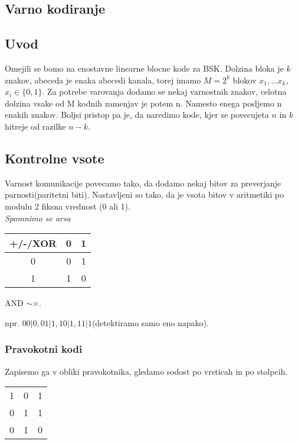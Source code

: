 \documentclass{article}
\begin{document}
\begin{multicols}{3}
\section{Varno kodiranje}

\subsection{Uvod}
Omejili se bomo na enostavne linearne blocne kode za BSK. Dolzina bloka je $k$ znakov, abeceda je enaka abecedi
kanala, torej imamo $M=2^k$ blokov $x_1, \dots x_k$, $x_i \in \{0, 1\}$. Za potrebe varovanja dodamo se nekaj
varnostnih znakov, celotna dolzina vsake od M kodnih zamenjav je potem n. Namesto enega posljemo n enakih znakov.
Boljsi pristop pa je, da naredimo kode, kjer se povecujeta $n$ in $k$ hitreje od razilke $n -k$.

\subsection{Kontrolne vsote}
Varnost komunikacije povecamo tako, da dodamo nekaj bitov za preverjanje parnosti(paritetni biti).
Nastavljeni so tako, da je vsota bitov v aritmetiki po modulu 2 fiksna vrednost (0 ali 1).\\
\textit{Spomnimo se arsa}
\begin{center}
    \begin{tabular}{ |c|c|c| } 
        \hline
        +/-/XOR & 0 & 1 \\ 
        \hline
            0   & 0 & 1 \\ 
            1   & 1 & 0 \\ 
        \hline
    \end{tabular}
    AND $\sim \times$.\\
\end{center}

npr. $00|0, 01|1, 10|1, 11|1$(detektiramo samo eno napako).

\subsubsection{Pravokotni kodi}
Zapisemo ga v obliki pravokotnika, gledamo sodost po vrsticah in po stolpcih.

\begin{center}
    \begin{tabular}{ |c|cc| } 
        \hline
            1   & 0 & 1 \\ 
            0   & 1 & 1 \\ 
            \hline
            0   & 1 & 0 \\ 
        \hline
    \end{tabular}
\end{center}


\end{multicols}
\end{document}
